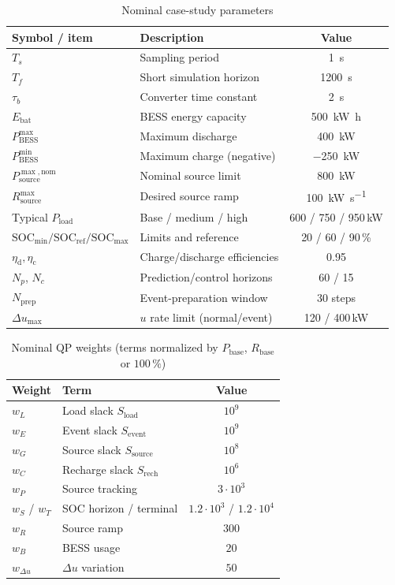\documentclass{ieeeaccess}
\begin{document}
\begin{table}[!t]
\centering
\caption{Nominal case-study parameters}
\label{tab:param}
{\footnotesize\setlength{\tabcolsep}{6pt}%
\begin{tabular}{@{}llc@{}}
\toprule
Symbol / item & Description & Value \\
\midrule
$T_s$ & Sampling period & \SI{1}{\second} \\
$T_f$ & Short simulation horizon & \SI{1200}{\second} \\
$\tau_b$ & Converter time constant & \SI{2}{\second} \\
$E_{\mathrm{bat}}$ & BESS energy capacity & \SI{500}{\kilo\watt\hour} \\
$P_{\mathrm{BESS}}^{\max}$ & Maximum discharge & \SI{400}{\kilo\watt} \\
$P_{\mathrm{BESS}}^{\min}$ & Maximum charge (negative) & \SI{-250}{\kilo\watt} \\
$P_{\mathrm{source}}^{\max,\mathrm{nom}}$ & Nominal source limit & \SI{800}{\kilo\watt} \\
$R_{\mathrm{source}}^{\max}$ & Desired source ramp & \SI{100}{\kilo\watt\per\second} \\
Typical $P_{\mathrm{load}}$ & Base / medium / high & 600 / 750 / 950\,kW \\
$\mathrm{SOC}_{\min}/\mathrm{SOC}_{\mathrm{ref}}/\mathrm{SOC}_{\max}$ & Limits and reference & 20 / 60 / 90\,\% \\
$\eta_{\mathrm{d}},\eta_{\mathrm{c}}$ & Charge/discharge efficiencies & 0.95 \\
$N_p$, $N_c$ & Prediction/control horizons & 60 / 15 \\
$N_{\mathrm{prep}}$ & Event-preparation window & 30 steps \\
$\Delta u_{\max}$ & $u$ rate limit (normal/event) & 120 / 400\,kW \\
\bottomrule
\end{tabular}}
\end{table}

\begin{table}[!t]
\centering
\caption{Nominal QP weights (terms normalized by $P_{\mathrm{base}}$, $R_{\mathrm{base}}$ or $100\,\%$)}
\label{tab:weights}
\begin{tabular}{@{}llc@{}}
\toprule
Weight & Term & Value \\
\midrule
$w_L$ & Load slack $S_{\mathrm{load}}$ & $10^{9}$ \\
$w_E$ & Event slack $S_{\mathrm{event}}$ & $10^{9}$ \\
$w_G$ & Source slack $S_{\mathrm{source}}$ & $10^{8}$ \\
$w_C$ & Recharge slack $S_{\mathrm{rech}}$ & $10^{6}$ \\
$w_P$ & Source tracking & $3\cdot 10^{3}$ \\
$w_S$ / $w_T$ & SOC horizon / terminal & $1.2\cdot 10^{3}$ / $1.2\cdot 10^{4}$ \\
$w_R$ & Source ramp & $300$ \\
$w_B$ & BESS usage & $20$ \\
$w_{\Delta u}$ & $\Delta u$ variation & $50$ \\
\bottomrule
\end{tabular}
\end{table}
\end{document}
